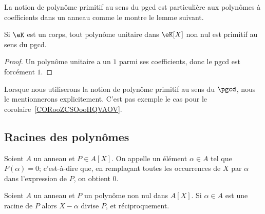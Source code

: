 La notion de polynôme primitif au sens du pgcd est particulière aux polynômes à coefficients dans un anneau comme le montre le lemme suivant.

\begin{lemma}
    Si \( \eK\) est un corps, tout polynôme unitaire dans \( \eK[X]\) non nul est primitif au sens du pgcd.
\end{lemma}

\begin{proof}
    Un polynôme unitaire a un \( 1\) parmi ses coefficients, donc le pgcd est forcément \( 1\).
\end{proof}

Lorsque nous utiliserons la notion de polynôme primitif au sens du \( \pgcd\), nous le mentionnerons explicitement. C'est pas exemple le cas pour le corolaire~\ref{CORooZCSOooHQVAOV}.

\subsection{Racines des polynômes}

\begin{definition}
  Soient \( A \) un anneau et \( P \in A[X] \). On appelle
   un élément \( \alpha \in A \)
  tel que \( P(\alpha) = 0 \); c'est-à-dire que, en remplaçant toutes
  les occurrences de $X$ par $\alpha$ dans l'expression de $P$, on
  obtient $0$.
\end{definition}

\begin{proposition} \label{PropHSQooASRbeA}
    Soient \( A\) un anneau et \( P\) un polynôme non nul dans \( A[X]\). Si \( \alpha\in A\) est une racine de \( P\) alors \( X-\alpha\) divise \( P\), et réciproquement.
\end{proposition}

